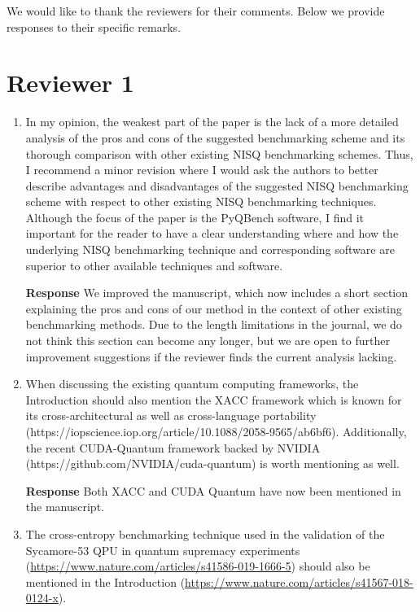 \documentclass[a4paper,12pt]{article}
\newcommand{\1}{{\rm 1\hspace{-0.9mm}l}}
\newenvironment{response}{\vspace{1em}\noindent\textbf{Response}}{\vspace{1em}}
\begin{document}
We would like to thank the reviewers for their comments. Below we provide
responses to their specific remarks.

\section{Reviewer 1}

\begin{enumerate}
  \item  In my opinion, the weakest part of the paper is the lack of a more
    detailed analysis of the pros and cons of the suggested benchmarking scheme
    and its thorough comparison with other existing NISQ benchmarking schemes.
    Thus, I recommend a minor revision where I would ask the authors to better
    describe advantages and disadvantages of the suggested NISQ benchmarking
    scheme with respect to other existing NISQ benchmarking techniques.
    Although the focus of the paper is the PyQBench software, I find it
    important for the reader to have a clear understanding where and how the
    underlying NISQ benchmarking technique and corresponding software are
    superior to other available techniques and software.

    \begin{response}
      We improved the manuscript, which now includes a short section explaining
      the pros and cons of our method in the context of other existing
      benchmarking methods. Due to the length limitations in the journal, we do
      not think this section can become any longer, but we are open to further
      improvement suggestions if the reviewer finds the current analysis
      lacking.
    \end{response}
  \item When discussing the existing quantum computing frameworks, the
    Introduction should also mention the XACC framework which is known for its
    cross-architectural as well as cross-language portability \\
    (https://iopscience.iop.org/article/10.1088/2058-9565/ab6bf6).
    Additionally, the recent CUDA-Quantum framework backed by NVIDIA
    (https://github.com/NVIDIA/cuda-quantum) is worth mentioning as well.

    \begin{response}
      Both XACC and CUDA Quantum have now been mentioned in the manuscript.
    \end{response}
  \item The cross-entropy benchmarking technique used in the validation of the
    Sycamore-53 QPU in quantum supremacy experiments
    (\url{https://www.nature.com/articles/s41586-019-1666-5}) should also be
    mentioned in the Introduction
    (\url{https://www.nature.com/articles/s41567-018-0124-x}).


\end{enumerate}
\end{document}
